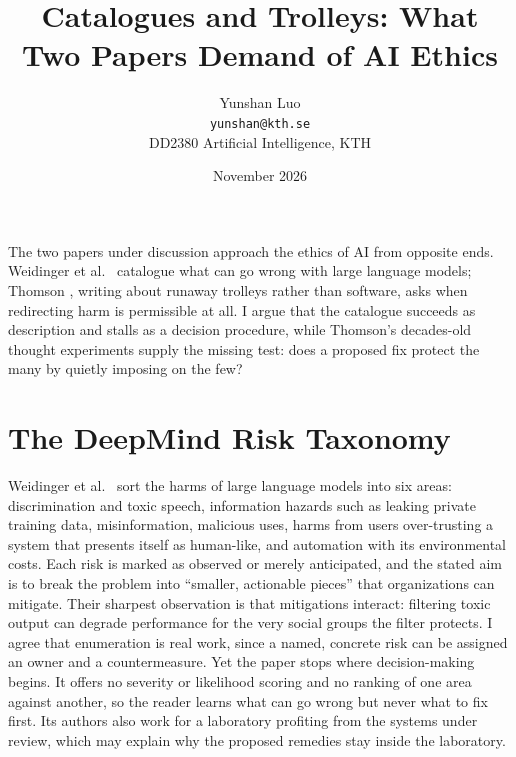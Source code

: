 \documentclass[11pt,a4paper]{article}
\title{Catalogues and Trolleys: What Two Papers Demand of AI Ethics}
\author{Yunshan Luo \\ \texttt{yunshan@kth.se} \\ DD2380 Artificial Intelligence, KTH}
\date{November 2026}
\begin{document}
\maketitle

The two papers under discussion approach the ethics of AI from opposite ends. Weidinger et al.\ \cite{weidinger} catalogue what can go wrong with large language models; Thomson \cite{thomson}, writing about runaway trolleys rather than software, asks when redirecting harm is permissible at all. I argue that the catalogue succeeds as description and stalls as a decision procedure, while Thomson's decades-old thought experiments supply the missing test: does a proposed fix protect the many by quietly imposing on the few?

\section*{The DeepMind Risk Taxonomy}
Weidinger et al.\ \cite{weidinger} sort the harms of large language models into six areas: discrimination and toxic speech, information hazards such as leaking private training data, misinformation, malicious uses, harms from users over-trusting a system that presents itself as human-like, and automation with its environmental costs. Each risk is marked as observed or merely anticipated, and the stated aim is to break the problem into ``smaller, actionable pieces'' that organizations can mitigate. Their sharpest observation is that mitigations interact: filtering toxic output can degrade performance for the very social groups the filter protects. I agree that enumeration is real work, since a named, concrete risk can be assigned an owner and a countermeasure. Yet the paper stops where decision-making begins. It offers no severity or likelihood scoring and no ranking of one area against another, so the reader learns what can go wrong but never what to fix first. Its authors also work for a laboratory profiting from the systems under review, which may explain why the proposed remedies stay inside the laboratory.
\end{document}
